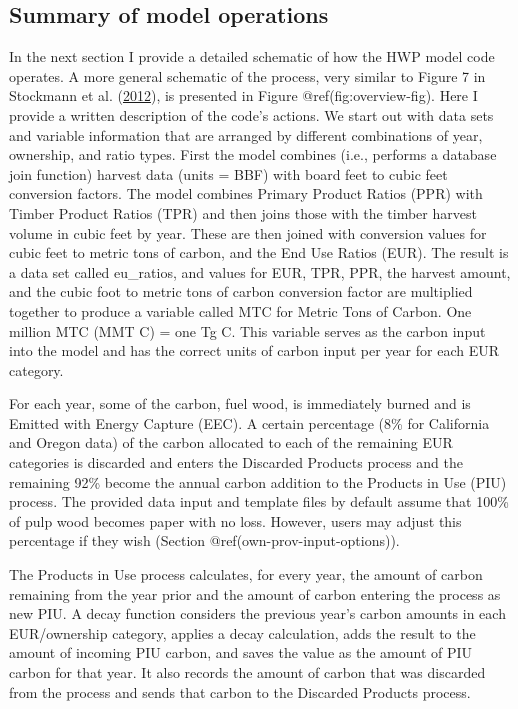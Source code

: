 \documentclass[
  openany]{book}
\begin{document}
\hypertarget{model-func-opp}{%
\subsection{Summary of model operations}\label{model-func-opp}}

In the next section I provide a detailed schematic of how the HWP model
code operates. A more general schematic of the process, very similar to
Figure 7 in Stockmann et al.
(\protect\hyperlink{ref-stockmann2012}{2012}), is presented in Figure
@ref(fig:overview-fig). Here I provide a written description of the
code's actions. We start out with data sets and variable information
that are arranged by different combinations of year, ownership, and
ratio types. First the model combines (i.e., performs a database join
function) harvest data (units = BBF) with board feet to cubic feet
conversion factors. The model combines Primary Product Ratios (PPR) with
Timber Product Ratios (TPR) and then joins those with the timber harvest
volume in cubic feet by year. These are then joined with conversion
values for cubic feet to metric tons of carbon, and the End Use Ratios
(EUR). The result is a data set called eu\_ratios, and values for EUR,
TPR, PPR, the harvest amount, and the cubic foot to metric tons of
carbon conversion factor are multiplied together to produce a variable
called MTC for Metric Tons of Carbon. One million MTC (MMT C) = one Tg
C. This variable serves as the carbon input into the model and has the
correct units of carbon input per year for each EUR category.

For each year, some of the carbon, fuel wood, is immediately burned and
is Emitted with Energy Capture (EEC). A certain percentage (8\% for
California and Oregon data) of the carbon allocated to each of the
remaining EUR categories is discarded and enters the Discarded Products
process and the remaining 92\% become the annual carbon addition to the
Products in Use (PIU) process. The provided data input and template
files by default assume that 100\% of pulp wood becomes paper with no
loss. However, users may adjust this percentage if they wish (Section
@ref(own-prov-input-options)).

The Products in Use process calculates, for every year, the amount of
carbon remaining from the year prior and the amount of carbon entering
the process as new PIU. A decay function considers the previous year's
carbon amounts in each EUR/ownership category, applies a decay
calculation, adds the result to the amount of incoming PIU carbon, and
saves the value as the amount of PIU carbon for that year. It also
records the amount of carbon that was discarded from the process and
sends that carbon to the Discarded Products process.
\end{document}
